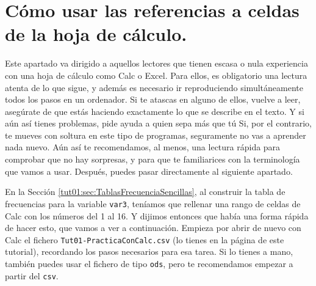 \documentclass[10pt,a4paper]{article}\usepackage[]{graphicx}\usepackage[]{color}
\newcounter {cont01}
\begin{document}
\section{Cómo usar las referencias a celdas de la hoja de cálculo.}
\label{tut01:sec:ComoTrabajarReferenciasHojasCalculo}

Este apartado va dirigido a aquellos lectores que tienen escasa o nula experiencia con una hoja de cálculo como Calc o Excel. Para ellos, es obligatorio una lectura atenta de lo que sigue, y además es necesario ir reproduciendo simultáneamente todos los pasos en un ordenador. Si te atascas en alguno de ellos, vuelve a leer, asegúrate de que estás haciendo exactamente lo que se describe en el texto. Y si aún así tienes problemas, pide ayuda a quien sepa más que tú  Si, por el contrario, te mueves con soltura en este tipo de programas, seguramente no vas a aprender nada nuevo. Aún así te recomendamos, al menos, una lectura rápida para comprobar que no hay sorpresas, y para que te familiarices con la terminología que vamos a usar. Después, puedes pasar directamente al siguiente apartado.

En la Sección \ref{tut01:sec:TablasFrecuenciaSencillas}, al construir la tabla de frecuencias para la variable {\tt var3},  teníamos que rellenar una rango de celdas de Calc con los números del 1 al 16. Y dijimos entonces que había una forma rápida de hacer esto, que vamos a ver a continuación. Empieza por abrir de nuevo con Calc el fichero {\tt Tut01-PracticaConCalc.csv} (lo tienes en la página \pageref{tut01:sec:TablasFrecuenciaSencillas} de este tutorial), recordando los pasos necesarios para esa tarea. Si lo tienes a mano, también puedes usar el fichero de tipo {\tt ods}, pero te recomendamos empezar a partir del {\tt csv}.
\end{document}
